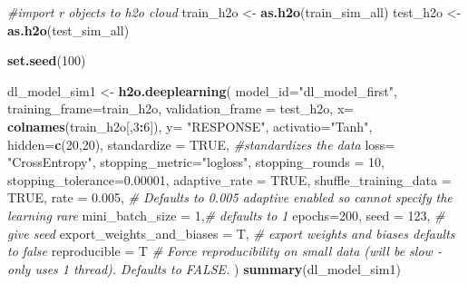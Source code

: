 \documentclass[]{article}
\newenvironment{Shaded}{\begin{snugshade}}{\end{snugshade}}
\newcommand{\KeywordTok}[1]{\textcolor[rgb]{0.13,0.29,0.53}{\textbf{#1}}}
\newcommand{\DataTypeTok}[1]{\textcolor[rgb]{0.13,0.29,0.53}{#1}}
\newcommand{\DecValTok}[1]{\textcolor[rgb]{0.00,0.00,0.81}{#1}}
\newcommand{\FloatTok}[1]{\textcolor[rgb]{0.00,0.00,0.81}{#1}}
\newcommand{\StringTok}[1]{\textcolor[rgb]{0.31,0.60,0.02}{#1}}
\newcommand{\CommentTok}[1]{\textcolor[rgb]{0.56,0.35,0.01}{\textit{#1}}}
\newcommand{\OtherTok}[1]{\textcolor[rgb]{0.56,0.35,0.01}{#1}}
\newcommand{\OperatorTok}[1]{\textcolor[rgb]{0.81,0.36,0.00}{\textbf{#1}}}
\newcommand{\NormalTok}[1]{#1}
\begin{document}
\begin{Shaded}
\begin{Highlighting}[]
\CommentTok{#import r objects to h2o cloud}
\NormalTok{train_h2o <-}\StringTok{ }\KeywordTok{as.h2o}\NormalTok{(train_sim_all)}
\NormalTok{test_h2o <-}\StringTok{ }\KeywordTok{as.h2o}\NormalTok{(test_sim_all)}

\KeywordTok{set.seed}\NormalTok{(}\DecValTok{100}\NormalTok{)}

\NormalTok{dl_model_sim1 <-}\StringTok{ }\KeywordTok{h2o.deeplearning}\NormalTok{(}
  \DataTypeTok{model_id=}\StringTok{"dl_model_first"}\NormalTok{, }
  \DataTypeTok{training_frame=}\NormalTok{train_h2o, }
  \DataTypeTok{validation_frame =}\NormalTok{ test_h2o,}
  \DataTypeTok{x=} \KeywordTok{colnames}\NormalTok{(train_h2o[,}\DecValTok{3}\OperatorTok{:}\DecValTok{6}\NormalTok{]),}
  \DataTypeTok{y=} \StringTok{"RESPONSE"}\NormalTok{,}
  \DataTypeTok{activatio=}\StringTok{"Tanh"}\NormalTok{,  }
  \DataTypeTok{hidden=}\KeywordTok{c}\NormalTok{(}\DecValTok{20}\NormalTok{,}\DecValTok{20}\NormalTok{), }
  \DataTypeTok{standardize =} \OtherTok{TRUE}\NormalTok{, }\CommentTok{#standardizes the data}
  \DataTypeTok{loss=} \StringTok{"CrossEntropy"}\NormalTok{,}
  \DataTypeTok{stopping_metric=}\StringTok{"logloss"}\NormalTok{,}
  \DataTypeTok{stopping_rounds =} \DecValTok{10}\NormalTok{,}
  \DataTypeTok{stopping_tolerance=}\FloatTok{0.00001}\NormalTok{,}
  \DataTypeTok{adaptive_rate =} \OtherTok{TRUE}\NormalTok{,}
  \DataTypeTok{shuffle_training_data =} \OtherTok{TRUE}\NormalTok{, }
  \DataTypeTok{rate =} \FloatTok{0.005}\NormalTok{, }\CommentTok{# Defaults to 0.005 adaptive enabled so cannot specify the learning rare }
  \DataTypeTok{mini_batch_size =} \DecValTok{1}\NormalTok{,}\CommentTok{# defaults to 1 }
  \DataTypeTok{epochs=}\DecValTok{200}\NormalTok{,}
  \DataTypeTok{seed =} \DecValTok{123}\NormalTok{, }\CommentTok{# give seed }
  \DataTypeTok{export_weights_and_biases =}\NormalTok{ T, }\CommentTok{# export weights and biases defaults to false}
  \DataTypeTok{reproducible =}\NormalTok{ T }\CommentTok{# Force reproducibility on small data (will be slow - only uses 1 thread). Defaults to FALSE.}
\NormalTok{)}
\KeywordTok{summary}\NormalTok{(dl_model_sim1)}
\end{Highlighting}
\end{Shaded}
\end{document}
